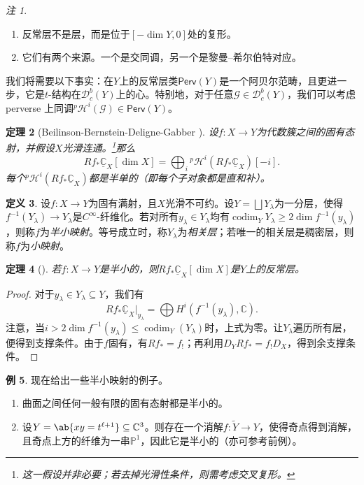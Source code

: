 \documentclass{amsart}
\newtheorem{thm}{定理}[section]
\theoremstyle{definition}
\newtheorem{defn}[thm]{定义}
\newtheorem{exms}[thm]{例}
\theoremstyle{remark}
\newtheorem{rmks}[thm]{注}
\theoremstyle{plain}
\theoremstyle{definition}
\theoremstyle{remark}
\newcommand{\C}{\mathbb{C}}
\renewcommand{\P}{\mathbb{P}}
\newcommand{\mc}[1]{\mathcal{#1}}
\newcommand{\on}[1]{\operatorname{#1}}
\newcommand{\ms}[1]{\mathsf{#1}}
\newcommand{\ul}[1]{\underline{#1}}
\newcommand{\1}{\mathbf{1}}
\newcommand{\2}{\mathbf{2}}
\newcommand{\3}{\mathbf{3}}
\begin{document}
\begin{rmks}\leavevmode
    \begin{enumerate}
        \item 反常层不是层，而是位于\([-\dim Y, 0]\)处的复形。
        \item 它们有两个来源。一个是交同调，另一个是黎曼–希尔伯特对应。
    \end{enumerate}
\end{rmks}

我们将需要以下事实：在\(Y\)上的反常层类\(\ms{Perv}(Y)\)是一个阿贝尔范畴，且更进一步，它是\(t\)-结构在\(\mc{D}_c^b(Y)\)上的心。特别地，对于任意\(\mc{G} \in \mc{D}_c^b (Y)\)，我们可以考虑 perverse 上同调\(^p\mc{H}^i(\mc{G}) \in \ms{Perv}(Y)\)。

\begin{thm}[Beilinson-Bernstein-Deligne-Gabber {\cite{BBD1982}}]
设\(f \colon X \to Y\)为代数簇之间的固有态射，并假设\(X\)光滑连通。\footnote{这一假设并非必要；若去掉光滑性条件，则需考虑交叉复形。}那么
    \[ R f_* \ul{\C}_X [\dim X] = \bigoplus_{i} {^p\mc{H}^i}(R f_* \ul{\C}_X)[-i]. \]
    每个\(^p\mc{H}^i (R f_* \ul{\C}_X)\)都是半单的（即每个子对象都是直和补）。
\end{thm}

\begin{defn}
设\(f \colon X \to Y\)为固有满射，且\(X\)光滑不可约。设\(Y = \bigsqcup Y_{\lambda}\)为一分层，使得\(f^{-1}(Y_{\lambda}) \to Y_{\lambda}\)是\(C^{\infty}\)-纤维化。若对所有\(y_{\lambda} \in Y_{\lambda}\)均有\(\on{codim}_Y Y_{\lambda} \geq 2 \dim f^{-1}(y_{\lambda})\)，则称\(f\)为\textit{半小映射}。等号成立时，称\(Y_{\lambda}\)为\textit{相关层}；若唯一的相关层是稠密层，则称\(f\)为\textit{小映射}。
\end{defn}

\begin{thm}[{\cite{DeCataldoMigliorini2002}}]
    若\(f \colon X \to Y\)是半小的，则\(R f_* \ul{\C}_X [\dim X]\)是\(Y\)上的反常层。
\end{thm}

\begin{proof}
    对于\(y_{\lambda} \in Y_{\lambda} \subseteq Y\)，我们有
    \[ R f_* \ul{\C}_X |_{y_{\lambda}} = \bigoplus H^i (f^{-1}(y_{\lambda}), \C). \]
    注意，当\(i > 2 \dim f^{-1}(y_{\lambda}) \leq \on{codim}_Y(Y_{\lambda})\)时，上式为零。让\(Y_{\lambda}\)遍历所有层，便得到支撑条件。由于\(f\)固有，有\(R f_* = f_!\)；再利用\(D_Y R f_* = f_! D_X\)，得到余支撑条件。
\end{proof}

\begin{exms}
    现在给出一些半小映射的例子。
    \begin{enumerate}
        \item 曲面之间任何一般有限的固有态射都是半小的。
        \item 设\(Y = \ab\{xy = t^{\ell+1}\} \subseteq \C^3\)。则存在一个消解\(f \colon \tilde{Y} \to Y\)，使得奇点得到消解，且奇点上方的纤维为一串\(\P^1\)，因此它是半小的（亦可参考前例）。
    \end{enumerate}
\end{exms}
\end{document}
